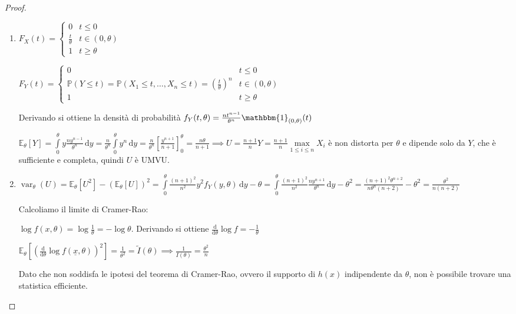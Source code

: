\documentclass[hidelinks, 10pt]{report}
\DeclareMathOperator{\var}{var}
\begin{document}
\begin{proof}
\noindent
\begin{enumerate}
\item $ F_{X} (t) = \begin{cases} 0 & t \le 0 \\ \frac{t}{\theta} & t \in (0, \theta) \\ 1 & t \ge \theta \end{cases} $

$ F_{Y} (t) = \begin{cases} 0 & t \le 0 \\ \mathbb{P}(Y \le t) = \mathbb{P} (X_{1} \le t, \dotsc, X_{n} \le t) = \left( \frac{t}{\theta} \right)^{n} & t \in (0, \theta) \\ 1 & t \ge \theta \end{cases} $

Derivando si ottiene la densit\`a di probabilit\`a $ f_{Y} (t, \theta) = \frac{n t^{n - 1}}{\theta^{n}} \mathbbm{1}_{(0, \theta)} (t) $

$ \mathbb{E}_{\theta} [Y] = \int\limits_{0}^{\theta} y \frac{n y^{n - 1}}{\theta^{n}} \, \mathrm{d}y = \frac{n}{\theta^{n}} \int\limits_{0}^{\theta} y^{n} \, \mathrm{d}y = \frac{n}{\theta^{n}} \left[ \frac{y^{n + 1}}{n + 1} \right]^{\theta}_{0} = \frac{n \theta}{n + 1} \implies U = \frac{n + 1}{n} Y = \frac{n + 1}{n} \max\limits_{1 \le i \le n} X_{i} $ \`e non distorta per $ \theta $ e dipende solo da $ Y $, che \`e sufficiente e completa, quindi $ U $ \`e UMVU.
\item $ \var_{\theta} (U) = \mathbb{E}_{\theta} [U^{2}] - (\mathbb{E}_{\theta} [U])^{2} = \int\limits_{0}^{\theta} \frac{(n + 1)^{2}}{n^{2}} y^{2} f_{Y} (y, \theta) \, \mathrm{d}y - \theta = \int\limits_{0}^{\theta} \frac{(n + 1)^{2}}{n^{2}} \frac{n y^{n+1}}{\theta^{n}} \, \mathrm{d}y - \theta^{2} = \frac{(n + 1)^{2} \theta^{n + 2}}{n \theta^{n}(n + 2)} - \theta^{2} = \frac{\theta^{2}}{n (n + 2)} $

Calcoliamo il limite di Cramer-Rao:

$ \log f(x, \theta) = \log \frac{1}{\theta} = - \log \theta $. Derivando si ottiene $ \frac{\mathrm{d}}{\mathrm{d}\theta} \log f = - \frac{1}{\theta} $

$ \mathbb{E}_{\theta} \left[ \left( \frac{\mathrm{d}}{\mathrm{d}\theta} \log f(\underline{x}, \theta) \right)^{2} \right] = \frac{1}{\theta^{2}} = \tilde{I}(\theta) \implies \frac{1}{I(\theta)} = \frac{\theta^{2}}{n} $

Dato che non soddisfa le ipotesi del teorema di Cramer-Rao, ovvero il supporto di $ h(x) $ indipendente da $ \theta $, non \`e possibile trovare una statistica efficiente.
\end{enumerate}
\end{proof}
\end{document}
